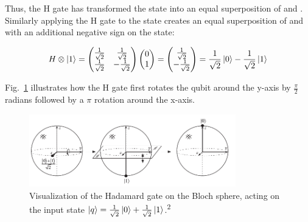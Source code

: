 Thus, the H gate has transformed the \0 state into an equal superposition of \0 and \1. Similarly applying the H gate to the \1 state creates an equal superposition of \0 and \1 with an additional negative sign on the \1 state:

\begin{equation}
\label{equ:hadamardverification2}
H \otimes \ket{1} = \begin{pmatrix}
 \frac{1}{\sqrt{2}} & \frac{1}{\sqrt{2}} \\ 
 \frac{1}{\sqrt{2}} & -\frac{1}{\sqrt{2}}
 \end{pmatrix} \begin{pmatrix}
 0 \\ 
 1
 \end{pmatrix} = \begin{pmatrix}
 \frac{1}{\sqrt{2}} \\ 
 -\frac{1}{\sqrt{2}}
 \end{pmatrix} = \frac{1}{\sqrt{2}} \ket{0} - \frac{1}{\sqrt{2}} \ket{1}
\end{equation}

Fig.~\ref{img:blochhgate} illustrates how the H gate first rotates the qubit around the y-axis by $\frac{\pi}{2}$ radians followed by a $\pi$ rotation around the x-axis.

\begin{figure}[ht]
   \centering
   \includegraphics[width=0.8\textwidth]{img/blochhadamardnielsenchuang.png}
   \caption{Visualization of the Hadamard gate on the Bloch sphere, acting on the input state $\ket{q} = \frac{1}{\sqrt{2}} \ket{0} + \frac{1}{\sqrt{2}} \ket{1}$.\textsuperscript{2}}
   \label{img:blochhgate}
\end{figure}



